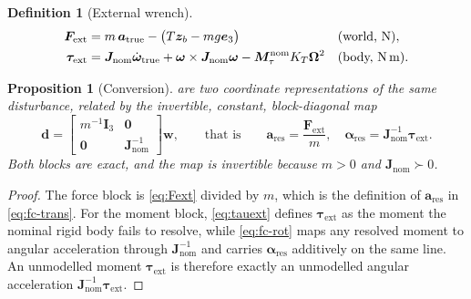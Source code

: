 \documentclass[11pt,a4paper,twoside,openright]{report}
\renewcommand{\vec}[1]{\bm{#1}}
\newcommand{\mat}[1]{\bm{#1}}
\newcommand{\dres}{\vec{d}}
\newcommand{\wrench}{\vec{w}}
\newcommand{\bodyrate}{\vec{\omega}}
\theoremstyle{plain}
\newtheorem{proposition}[theorem]{Proposition}
\theoremstyle{definition}
\newtheorem{definition}[theorem]{Definition}
\theoremstyle{remark}
\begin{document}
	\begin{definition}[External wrench]
		\label{def:wrench}
		\begin{align}
			\vec F_\mathrm{ext} &= m\,\vec a_\mathrm{true}
			-\big(T\vec z_b-mg\vec e_3\big) && \text{(world, \si{\newton})},
			\label{eq:Fext}\\
			\vec\tau_\mathrm{ext} &= \mat J_\mathrm{nom}\dot{\bodyrate}_\mathrm{true}
			+\bodyrate\times\mat J_\mathrm{nom}\bodyrate
			-\mat M_\tau^\mathrm{nom}K_T\vec\Omega^2 && \text{(body, \si{\newton\metre})}.
			\label{eq:tauext}
		\end{align}
	\end{definition}

	\begin{proposition}[Conversion]
		\label{prop:convert}
		 are two coordinate representations of the same
		disturbance, related by the invertible, constant, block-diagonal map
		\begin{equation}
			\dres=\begin{bmatrix}m^{-1}\mat I_3 & \mat 0\\[2pt]
				\mat 0 & \mat J_\mathrm{nom}^{-1}\end{bmatrix}\wrench,
			\qquad\text{that is}\qquad
			\vec a_\mathrm{res}=\frac{\vec F_\mathrm{ext}}{m},
			\quad
			\vec\alpha_\mathrm{res}=\mat J_\mathrm{nom}^{-1}\vec\tau_\mathrm{ext}.
			\label{eq:convert}
		\end{equation}
		Both blocks are exact, and the map is invertible because $m>0$ and
		$\mat J_\mathrm{nom}\succ0$.
	\end{proposition}

	\begin{proof}
		The force block is \cref{eq:Fext} divided by $m$, which is the definition of
		$\vec a_\mathrm{res}$ in \cref{eq:fc-trans}. For the moment block,
		\cref{eq:tauext} defines $\vec\tau_\mathrm{ext}$ as the moment the nominal
		rigid body fails to resolve, while \cref{eq:fc-rot} maps any resolved moment
		to angular acceleration through $\mat J_\mathrm{nom}^{-1}$ and carries
		$\vec\alpha_\mathrm{res}$ additively on the same line. An unmodelled moment
		$\vec\tau_\mathrm{ext}$ is therefore exactly an unmodelled angular
		acceleration $\mat J_\mathrm{nom}^{-1}\vec\tau_\mathrm{ext}$.
	\end{proof}
\end{document}
